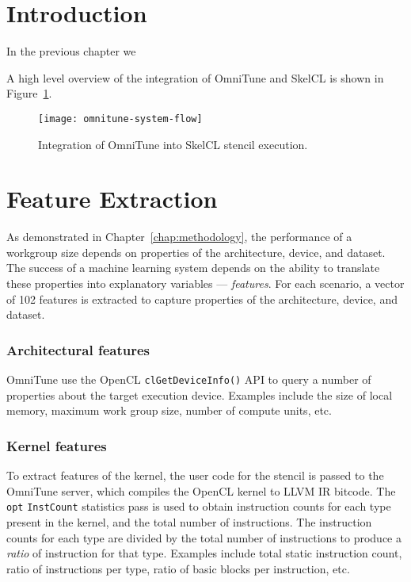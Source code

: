 \section{Introduction}

In the previous chapter we

A high level overview of the integration of OmniTune and SkelCL is
shown in Figure~\ref{fig:omnitune-system-flow}.

\begin{figure}
\centering
\texttt{[image: omnitune-system-flow]}
\caption{%
  Integration of OmniTune into SkelCL stencil execution.%
}
\label{fig:omnitune-system-flow}
\end{figure}

\section{Feature Extraction}

As demonstrated in Chapter~\ref{chap:methodology}, the performance of
a workgroup size depends on properties of the architecture, device,
and dataset. The success of a machine learning system depends on the
ability to translate these properties into explanatory variables ---
\emph{features}. For each scenario, a vector of 102 features is
extracted to capture properties of the architecture, device, and
dataset.


\subsubsection{Architectural features}

OmniTune use the OpenCL \texttt{clGetDeviceInfo()} API to query a
number of properties about the target execution device. Examples
include the size of local memory, maximum work group size, number of
compute units, etc.


\subsubsection{Kernel features}

To extract features of the kernel, the user code for the stencil is
passed to the OmniTune server, which compiles the OpenCL kernel to
LLVM IR bitcode. The \texttt{opt} \texttt{InstCount} statistics pass
is used to obtain instruction counts for each type present in the
kernel, and the total number of instructions. The instruction counts
for each type are divided by the total number of instructions to
produce a \emph{ratio} of instruction for that type. Examples include
total static instruction count, ratio of instructions per type, ratio
of basic blocks per instruction, etc.

